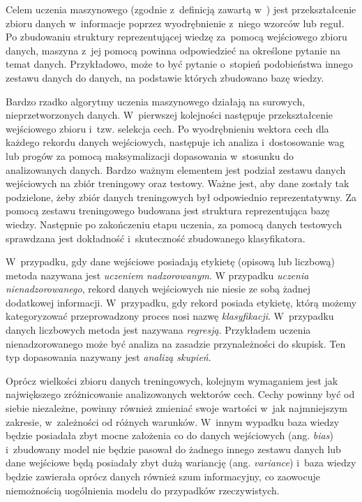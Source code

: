       Celem uczenia maszynowego (zgodnie z~definicją zawartą w~\cite{StatystyczneSystemyUczaceSie}) jest przekształcenie zbioru danych w~informacje poprzez wyodrębnienie z~niego wzorców lub reguł. Po zbudowaniu struktury reprezentującej wiedzę za~pomocą wejściowego zbioru danych, maszyna z~jej pomocą powinna odpowiedzieć na określone pytanie na temat danych. Przykładowo, może to być pytanie o~stopień podobieństwa innego zestawu danych do danych, na podstawie których zbudowano bazę wiedzy.

      Bardzo rzadko algorytmy uczenia maszynowego działają na surowych, nieprzetworzonych danych. W~pierwszej kolejności następuje przekształcenie wejściowego zbioru i~tzw. selekcja cech. Po wyodrębnieniu wektora cech dla każdego rekordu danych wejściowych, następuje ich analiza i~dostosowanie wag lub progów za pomocą maksymalizacji dopasowania w~stosunku do analizowanych danych. Bardzo ważnym elementem jest podział zestawu danych wejściowych na zbiór treningowy oraz testowy. Ważne jest, aby dane zostały tak podzielone, żeby zbiór danych treningowych był odpowiednio reprezentatywny. Za pomocą zestawu treningowego budowana jest struktura reprezentująca bazę wiedzy. Następnie po zakończeniu etapu uczenia, za pomocą danych testowych sprawdzana jest dokładność i~skuteczność zbudowanego klasyfikatora.

      W~przypadku, gdy dane wejściowe posiadają etykietę (opisową lub liczbową) metoda nazywana jest \textit{uczeniem nadzorowanym}. W przypadku \textit{uczenia nienadzorowanego}, rekord danych wejściowych nie niesie ze sobą żadnej dodatkowej informacji. W~przypadku, gdy rekord posiada etykietę, którą możemy kategoryzować przeprowadzony proces nosi nazwę \textit{klasyfikacji}. W~przypadku danych liczbowych metoda jest nazywana \textit{regresją}. Przykładem uczenia nienadzorowanego może być analiza na zasadzie przynależności do skupisk. Ten typ dopasowania nazywany jest \textit{analizą skupień}.

      Oprócz wielkości zbioru danych treningowych, kolejnym wymaganiem jest jak największego zróżnicowanie analizowanych wektorów cech. Cechy powinny być od siebie niezależne, powinny również zmieniać swoje wartości w~jak najmniejszym zakresie, w~zależności od różnych warunków. W~innym wypadku baza wiedzy będzie posiadała zbyt mocne założenia co do danych wejściowych (ang. \textit{bias}) i~zbudowany model nie będzie pasował do żadnego innego zestawu danych lub dane wejściowe będą posiadały zbyt dużą wariancję (ang. \textit{variance}) i~baza wiedzy będzie zawierała oprócz danych również szum informacyjny, co zaowocuje niemożnością uogólnienia modelu do przypadków rzeczywistych.

